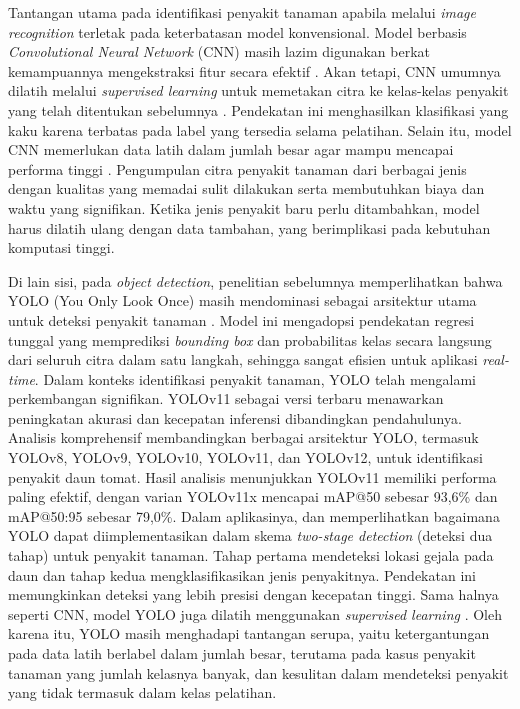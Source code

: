Tantangan utama pada identifikasi penyakit tanaman apabila melalui \textit{image recognition} terletak pada keterbatasan model konvensional. Model berbasis \textit{Convolutional Neural Network} (CNN) masih lazim digunakan berkat kemampuannya mengekstraksi fitur secara efektif \parencite{gulmezComprehensiveReviewConvolutional2025}. Akan tetapi, CNN umumnya dilatih melalui \textit{supervised learning} untuk memetakan citra ke kelas-kelas penyakit yang telah ditentukan sebelumnya \parencite{pacalSystematicReviewDeep2024}. Pendekatan ini menghasilkan klasifikasi yang kaku karena terbatas pada label yang tersedia selama pelatihan. Selain itu, model CNN memerlukan data latih dalam jumlah besar agar mampu mencapai performa tinggi \parencite{liuCrossModalDataFusion2025}. Pengumpulan citra penyakit tanaman dari berbagai jenis dengan kualitas yang memadai sulit dilakukan serta membutuhkan biaya dan waktu yang signifikan. Ketika jenis penyakit baru perlu ditambahkan, model harus dilatih ulang dengan data tambahan, yang berimplikasi pada kebutuhan komputasi tinggi.

Di lain sisi, pada \textit{object detection}, penelitian sebelumnya memperlihatkan bahwa YOLO (You Only Look Once) masih mendominasi sebagai arsitektur utama untuk deteksi penyakit tanaman \parencite{ranaDetectionPlantDiseases2025}. Model ini mengadopsi pendekatan regresi tunggal yang memprediksi \textit{bounding box} dan probabilitas kelas secara langsung dari seluruh citra dalam satu langkah, sehingga sangat efisien untuk aplikasi \textit{real-time}. Dalam konteks identifikasi penyakit tanaman, YOLO telah mengalami perkembangan signifikan. YOLOv11 sebagai versi terbaru menawarkan peningkatan akurasi dan kecepatan inferensi dibandingkan pendahulunya. Analisis komprehensif \textcite{ramosComprehensiveAnalysisYOLO2025} membandingkan berbagai arsitektur YOLO, termasuk YOLOv8, YOLOv9, YOLOv10, YOLOv11, dan YOLOv12, untuk identifikasi penyakit daun tomat. Hasil analisis menunjukkan YOLOv11 memiliki performa paling efektif, dengan varian YOLOv11x mencapai mAP@50 sebesar 93,6\% dan mAP@50:95 sebesar 79,0\%. Dalam aplikasinya, \textcite{abhiramNovelTwoStageDeep2024} dan \textcite{yaoTwoStageDetectionAlgorithm2024} memperlihatkan bagaimana YOLO dapat diimplementasikan dalam skema \textit{two-stage detection} (deteksi dua tahap) untuk penyakit tanaman. Tahap pertama mendeteksi lokasi gejala pada daun dan tahap kedua mengklasifikasikan jenis penyakitnya. Pendekatan ini memungkinkan deteksi yang lebih presisi dengan kecepatan tinggi. Sama halnya seperti CNN, model YOLO juga dilatih menggunakan \textit{supervised learning} \parencite{pacalSystematicReviewDeep2024}. Oleh karena itu, YOLO masih menghadapi tantangan serupa, yaitu ketergantungan pada data latih berlabel dalam jumlah besar, terutama pada kasus penyakit tanaman yang jumlah kelasnya banyak, dan kesulitan dalam mendeteksi penyakit yang tidak termasuk dalam kelas pelatihan.


